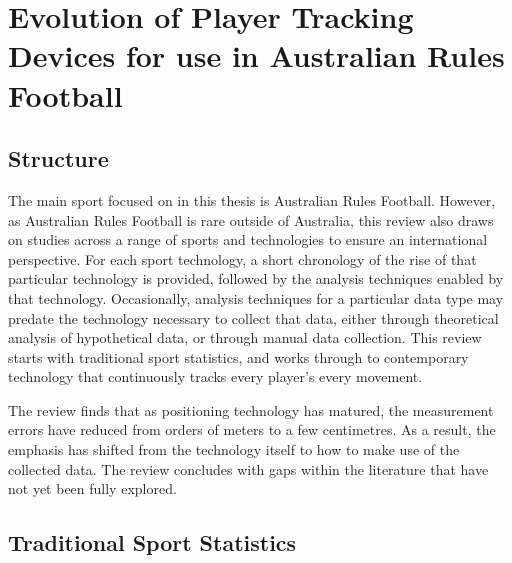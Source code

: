 
\section{Evolution of Player Tracking Devices for use in Australian Rules Football}\label{literature-review}

\subsection{Structure}\label{structure}


The main sport focused on in this thesis is Australian Rules Football.
However, as Australian Rules Football is rare outside of Australia, this
review also draws on studies across a range of sports and
technologies to ensure an international perspective.
For each sport technology, a short
chronology of the rise of that particular technology is provided, followed by the
analysis techniques enabled by that technology. Occasionally, analysis techniques for a particular
data type may predate the technology necessary to collect that data, either through theoretical analysis of hypothetical data, or
through manual data collection. This review starts with traditional sport
statistics, and works through to contemporary technology that
continuously tracks every player's every movement.

The review finds that as positioning technology has matured, the measurement
errors have reduced from orders of meters to a few
centimetres. As a result, the emphasis has shifted from the technology
itself to how to make use of the collected data. The review concludes with gaps within the literature that have not yet been fully explored.


\subsection{Traditional Sport
Statistics}\label{traditional-sport-statistics}

